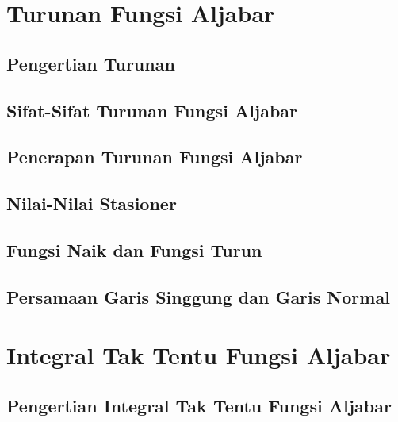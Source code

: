 \documentclass[11pt,fleqn]{book} %
\begin{document}

\chapter{Turunan Fungsi Aljabar}

\section{Pengertian Turunan}

\section{Sifat-Sifat Turunan Fungsi Aljabar}

\section{Penerapan Turunan Fungsi Aljabar}

\section{Nilai-Nilai Stasioner}

\section{Fungsi Naik dan Fungsi Turun}

\section{Persamaan Garis Singgung dan Garis Normal}


\chapter{Integral Tak Tentu Fungsi Aljabar}

\section{Pengertian Integral Tak Tentu Fungsi Aljabar}
\end{document}
